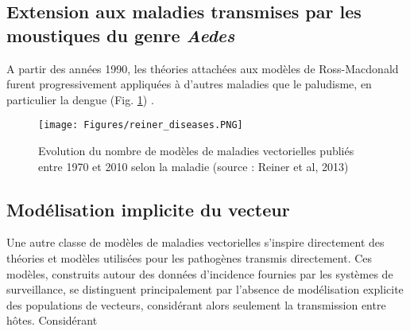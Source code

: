\subsection{Extension aux maladies transmises par les moustiques du genre {\em Aedes}}

A partir des années 1990, les théories attachées aux modèles de Ross-Macdonald furent progressivement appliquées à d'autres maladies que le paludisme, en particulier la dengue (Fig. \ref{fig:reiner_diseases}) \cite{reiner_systematic_2013}.


\begin{figure}[t]
	\centering
	\texttt{[image: Figures/reiner\_diseases.PNG]}
	\caption{Evolution du nombre de modèles de maladies vectorielles publiés entre 1970 et 2010 selon la maladie (source : Reiner et al, 2013)}
	\label{fig:reiner_diseases}
\end{figure}



\subsection{Modélisation implicite du vecteur}
\label{sec:sir}




Une autre classe de modèles de maladies vectorielles s'inspire directement des théories et modèles utilisées pour les pathogènes transmis directement.
Ces modèles, construits autour des données d'incidence fournies par les systèmes de surveillance, se distinguent principalement par l'absence de modélisation explicite des populations de vecteurs, considérant alors seulement la transmission entre hôtes. 
Considérant 


